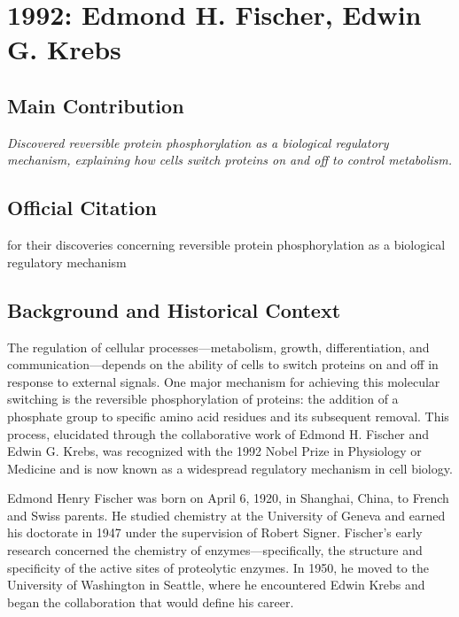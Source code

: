 \chapter[1992 --- Fischer et al.]{1992: Edmond H. Fischer, Edwin G. Krebs}
\label{ch:1992_Fischer}

\section*{Main Contribution}

\textit{Discovered reversible protein phosphorylation as a biological regulatory mechanism, explaining how cells switch proteins on and off to control metabolism.}\cite{nobel-1992,lecture-1992}

\section{Official Citation}

for their discoveries concerning reversible protein phosphorylation as a biological regulatory mechanism

\section{Background and Historical Context}

The regulation of cellular processes---metabolism, growth, differentiation, and communication---depends on the ability of cells to switch proteins on and off in response to external signals. One major mechanism for achieving this molecular switching is the reversible phosphorylation of proteins: the addition of a phosphate group to specific amino acid residues and its subsequent removal. This process, elucidated through the collaborative work of Edmond H. Fischer and Edwin G. Krebs, was recognized with the 1992 Nobel Prize in Physiology or Medicine and is now known as a widespread regulatory mechanism in cell biology.

Edmond Henry Fischer was born on April 6, 1920, in Shanghai, China, to French and Swiss parents. He studied chemistry at the University of Geneva and earned his doctorate in 1947 under the supervision of Robert Signer. Fischer's early research concerned the chemistry of enzymes---specifically, the structure and specificity of the active sites of proteolytic enzymes. In 1950, he moved to the University of Washington in Seattle, where he encountered Edwin Krebs and began the collaboration that would define his career.

